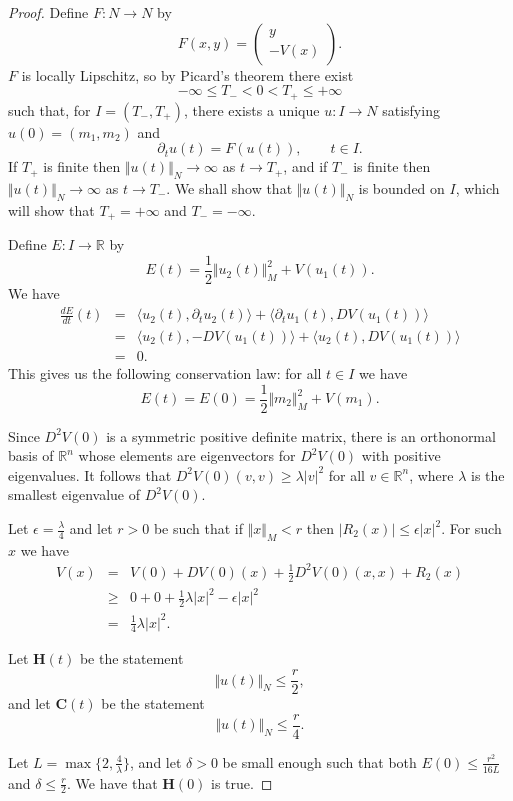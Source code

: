 \documentclass{article}
\newcommand{\norm}[1]{\Vert #1 \Vert}
\begin{document}
\begin{proof}
Define $F:N \to N$ by 
\[
F(x,y)=\begin{pmatrix} y\\-V(x) \end{pmatrix}.
\]
$F$ is locally Lipschitz, so by Picard's theorem there exist 
\[
-\infty \leq T_- < 0 < T_+ \leq +\infty
\]
such that, for $I=(T_-,T_+)$, there exists a unique $u:I \to N$ satisfying  $u(0)=(m_1,m_2)$ and
\[
\partial_t u(t)=F(u(t)), \qquad t \in I.
\]
If $T_+$ is finite then $\norm{u(t)}_N \to \infty$ as $t \to T_+$, and if $T_-$ is finite then $\norm{u(t)}_N \to \infty$ as $t \to T_-$. 
We shall show that $\norm{u(t)}_N$ is bounded on $I$, which will show that $T_+=+\infty$ and $T_-=-\infty$.

Define $E:I \to \mathbb{R}$ by
\[
E(t)=\frac{1}{2}\norm{u_2(t)}_M^2+V(u_1(t)).
\]
We have
\begin{eqnarray*}
\frac{dE}{dt}(t)&=&\langle u_2(t),\partial_t u_2(t) \rangle+\langle \partial_t u_1(t), DV(u_1(t)) \rangle\\
&=&\langle u_2(t),-DV(u_1(t)) \rangle + \langle u_2(t), DV(u_1(t)) \rangle\\
&=&0.
\end{eqnarray*}
This gives us the following conservation law: for all $t \in I$ we have
\[
E(t)=E(0)=\frac{1}{2}\norm{m_2}_M^2+V(m_1).
\]


Since $D^2 V(0)$ is a symmetric positive definite matrix, there is an orthonormal basis of $\mathbb{R}^n$ whose
elements are eigenvectors for $D^2 V(0)$ with positive eigenvalues. It follows that $D^2 V(0)(v,v) \geq \lambda |v|^2$ for all $v \in
\mathbb{R}^n$, where $\lambda$ is the smallest eigenvalue of $D^2 V(0)$. 

Let $\epsilon=\frac{\lambda}{4}$ and let $r>0$ be such that if $\norm{x}_M < r$ then $|R_2(x)| \leq \epsilon |x|^2$. For such $x$ we have
\begin{eqnarray*}
V(x)&=&V(0)+DV(0)(x)+\frac{1}{2}D^2 V(0)(x,x)+R_2(x)\\
&\geq&0+0+\frac{1}{2} \lambda |x|^2-\epsilon|x|^2\\
&=&\frac{1}{4}\lambda |x|^2.
\end{eqnarray*}


Let $\mathbf{H}(t)$ be the statement
\[
\norm{u(t)}_N \leq \frac{r}{2},
\]
and let $\mathbf{C}(t)$ be the statement
\[
\norm{u(t)}_N \leq \frac{r}{4}.
\]

Let  $L=\max\{2,\frac{4}{\lambda}\}$, and let $\delta>0$ be small enough such that both $E(0) \leq \frac{r^2}{16L}$ and $\delta \leq \frac{r}{2}$.
 We have that $\mathbf{H}(0)$ is true.


\end{proof}
\end{document}
